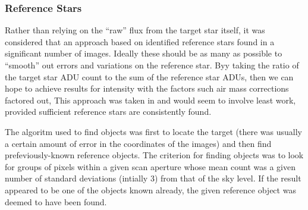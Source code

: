 \subsubsection{Reference Stars}
\protect\label{section:refstars}

Rather than relying on the ``raw'' flux from the target star itself, it was
considered that an approach based on identified reference stars found in a
significant number of images.
Ideally these should be as many as possible to ``smooth'' out errors and variations on the reference star. 
Byy taking the ratio of the target star ADU count to the sum of the reference
star ADUs, then we can hope to achieve results for intensity with the factors such air mass corrections factored out, This
approach was taken in \citet{berry11} and would seem to involve least work, provided sufficient reference stars are
consistently found.

The algoritm used to find objects was first to locate the target (there was
usually a certain amount of error in the coordinates of the images) and then
find prefeviously-known reference objects. The criterion for finding objects was to look for groups of pixels within a
given scan aperture whose mean count was a given number of standard deviations
(intially 3) from that of the sky level. If the result appeared to be one of
the objects known already, the given reference object was deemed to have been
found.

